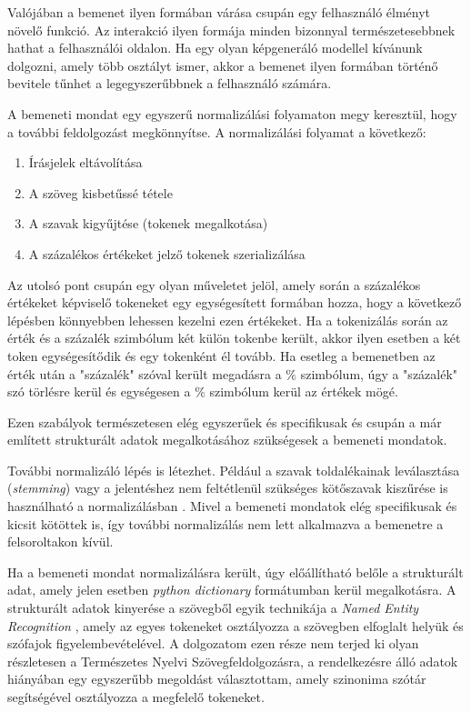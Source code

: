 Valójában a bemenet ilyen formában várása csupán egy felhasználó élményt növelő funkció. Az interakció ilyen formája minden bizonnyal természetesebbnek hathat a felhasználói oldalon. Ha egy olyan képgeneráló modellel kívánunk dolgozni, amely több osztályt ismer, akkor a bemenet ilyen formában történő bevitele tűnhet a legegyszerűbbnek a felhasználó számára.

A bemeneti mondat egy egyszerű normalizálási folyamaton megy keresztül, hogy a további feldolgozást megkönnyítse. A normalizálási folyamat a következő:

\begin{enumerate}
	\item Írásjelek eltávolítása
	\item A szöveg kisbetűssé tétele
	\item A szavak kigyűjtése (tokenek megalkotása)
	\item A százalékos értékeket jelző tokenek szerializálása
\end{enumerate}

Az utolsó pont csupán egy olyan műveletet jelöl, amely során a százalékos értékeket képviselő tokeneket egy egységesített formában hozza, hogy a következő lépésben könnyebben lehessen kezelni ezen értékeket. Ha a tokenizálás során az érték és a százalék szimbólum két külön tokenbe került, akkor ilyen esetben a két token egységesítődik és egy tokenként él tovább. Ha esetleg a bemenetben az érték után a "százalék" szóval került megadásra a $\%$ szimbólum, úgy a "százalék" szó törlésre kerül és egységesen a $\%$ szimbólum kerül az értékek mögé.

Ezen szabályok természetesen elég egyszerűek és specifikusak és csupán a már említett strukturált adatok megalkotásához szükségesek a bemeneti mondatok.

További normalizáló lépés is létezhet. Például a szavak toldalékainak leválasztása (\textit{stemming}) vagy a jelentéshez nem feltétlenül szükséges kötőszavak kiszűrése is használható a normalizálásban \cite{bird2009natural}. Mivel a bemeneti mondatok elég specifikusak és kicsit kötöttek is, így további normalizálás nem lett alkalmazva a bemenetre a felsoroltakon kívül.


Ha a bemeneti mondat normalizálásra került, úgy előállítható belőle a strukturált adat, amely jelen esetben \textit{python dictionary} formátumban kerül megalkotásra. A strukturált adatok kinyerése a szövegből egyik technikája a \textit{Named Entity Recognition} \cite{bird2009natural}, amely az egyes tokeneket osztályozza a szövegben elfoglalt helyük és szófajok figyelembevételével. A dolgozatom ezen része nem terjed ki olyan részletesen a Természetes Nyelvi Szövegfeldolgozásra, a rendelkezésre álló adatok hiányában egy egyszerűbb megoldást választottam, amely szinonima szótár segítségével osztályozza a megfelelő tokeneket.

